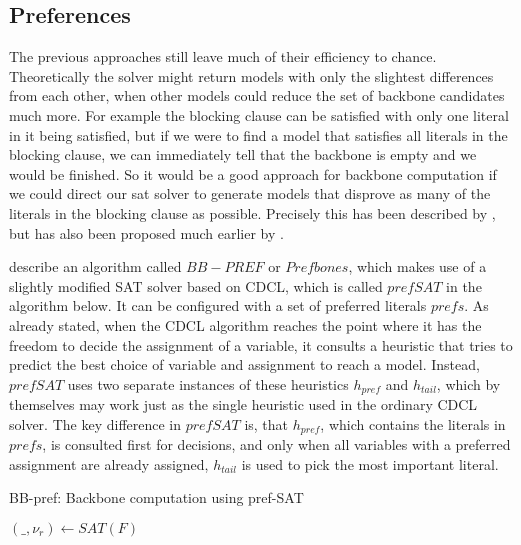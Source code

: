 \subsection{Preferences}
\label{ss:prefs}
The previous approaches still leave much of their efficiency to chance. Theoretically the solver might return models with only the slightest differences from each other, when other models could reduce the set of backbone candidates much more. For example the blocking clause can be satisfied with only one literal in it being satisfied, but if we were to find a model that satisfies all literals in the blocking clause, we can immediately tell that the backbone is empty and we would be finished. So it would be a good approach for backbone computation if we could direct our sat solver to generate models that disprove as many of the literals in the blocking clause as possible. Precisely this has been described by \cite{PJ18}, but has also been proposed much earlier by \cite{kk01}. 

\cite{PJ18} describe an algorithm called $BB-PREF$ or $Prefbones$, which makes use of a slightly modified SAT solver based on CDCL, which is called $prefSAT$ in the algorithm below. It can be configured with a set of preferred literals $prefs$. As already stated, when the CDCL algorithm reaches the point where it has the freedom to decide the assignment of a variable, it consults a heuristic that tries to predict the best choice of variable and assignment to reach a model. Instead, $prefSAT$ uses two separate instances of these heuristics $h_{pref}$ and $h_{tail}$, which by themselves may work just as the single heuristic used in the ordinary CDCL solver. The key difference in $prefSAT$ is, that $h_{pref}$, which contains the literals in $prefs$,  is consulted first for decisions, and only when all variables with a preferred assignment are already assigned, $h_{tail}$ is used to pick the most important literal.


\begin{algorithm}
\caption{{\sc BB-pref: Backbone computation using pref-SAT}}
\label{alg:pb0}
\DontPrintSemicolon
{}

$(\_,\nu_r) \gets SAT(F) $\;

\end{algorithm}

